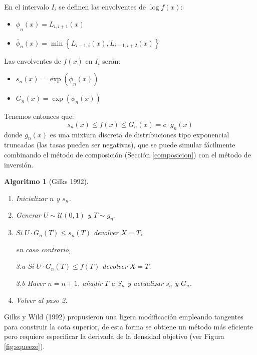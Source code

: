 \documentclass[
]{book}
\theoremstyle{break}
\newtheorem{conjecture}{Algoritmo}[chapter]
\theoremstyle{nonumberplain}
\begin{document}
En el intervalo \(I_{i}\) se definen las envolventes de \(\log f\left( x\right)\):

\begin{itemize}
\item
  \(\underline{\phi}_n(x)=L_{i,i+1}(x)\)
\item
  \(\overline{\phi}_n(x)=\min \left\{L_{i-1,i}(x),L_{i+1,i+2}(x)\right\}\)
\end{itemize}

Las envolventes de \(f(x)\) en \(I_{i}\) serán:

\begin{itemize}
\item
  \(s_n(x)=\exp \left( \underline{\phi}_n(x)\right)\)
\item
  \(G_n(x)=\exp \left( \overline{\phi}_n(x)\right)\)
\end{itemize}

Tenemos entonces que:
\[s_n(x)\leq f(x) \leq G_n(x)=c\cdot g_n(x)\]
donde \(g_n(x)\) es una mixtura discreta de distribuciones tipo exponencial truncadas (las tasas pueden ser negativas), que se puede simular fácilmente combinando el método de composición (Sección \ref{composicion}) con el método de inversión.

\begin{conjecture}[Gilks 1992]
\protect\hypertarget{cnj:gilks}{}\label{cnj:gilks}

\begin{enumerate}
\def\labelenumi{\arabic{enumi}.}
\item
  Inicializar \(n\) y \(s_n\).
\item
  Generar \(U \sim \mathcal{U}(0, 1)\) y
  \(T\sim g_n\).
\item
  Si \(U\cdot G_n\left( T\right) \leq s_n\left( T\right)\)
  devolver \(X=T\),

  en caso contrario,

  3.a Si \(U\cdot G_n\left( T\right) \leq f\left( T\right)\)
  devolver \(X=T\).

  3.b Hacer \(n=n+1\), añadir \(T\) a \(S_n\)
  y actualizar \(s_n\) y \(G_n\).
\item
  Volver al paso 2.
\end{enumerate}

\end{conjecture}

Gilks y Wild (1992) propusieron una ligera modificación empleando tangentes para construir la cota superior, de esta forma se obtiene un método más eficiente pero requiere especificar la derivada de la densidad objetivo (ver Figura \ref{fig:squeeze}).
\end{document}
